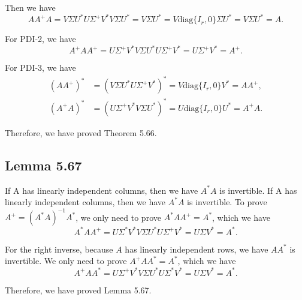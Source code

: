 \documentclass[a4paper]{article}
\begin{document}
Then we have 
\begin{equation}
    A A^+ A = V\Sigma U^* U \Sigma^{+} V^* V\Sigma U^* = V\Sigma U^* = V \text{diag} \{I_r, 0\} \Sigma U^* = V\Sigma U^* = A.
\end{equation}

For PDI-2, we have
\begin{equation}
    A^+ A A^+ = U \Sigma^{+} V^* V\Sigma U^* U \Sigma^{+} V^* = U \Sigma^{+} V^* = A^+.
\end{equation}

For PDI-3, we have
\begin{equation}
    \begin{aligned}
        (A A^+)^* &= (V\Sigma U^* U \Sigma^{+} V^*)^* = V \text{diag} \{I_r, 0\} V^* = A A^+, \\
        (A^+ A)^* &= (U \Sigma^{+} V^* V\Sigma U^*)^* = U \text{diag} \{I_r, 0\} U^* = A^+ A.
    \end{aligned}
\end{equation}

Therefore, we have proved Theorem 5.66.

\subsection*{Lemma 5.67}

If A has linearly independent columns, then we have $A^* A$ is invertible. If A has linearly independent columns, then we have $A^* A$ is invertible. To prove $A^+ = (A^* A)^{-1} A^*$,
we only need to prove $A^* A A^+ = A^*$, which we have
\begin{equation}
    A^* A A^+ = U \Sigma^* V^* V \Sigma U^* U \Sigma^{+} V^* = U \Sigma V^* = A^*.
\end{equation}

For the right inverse, because $A$ has linearly independent rows, we have $A A^*$ is invertible. We only need to prove $A^+ A A^* = A^*$, which we have
\begin{equation}
    A^+ A A^* = U \Sigma^{+} V^* V \Sigma U^* U \Sigma^* V^* = U \Sigma V^* = A^*.
\end{equation}

Therefore, we have proved Lemma 5.67.
\end{document}
